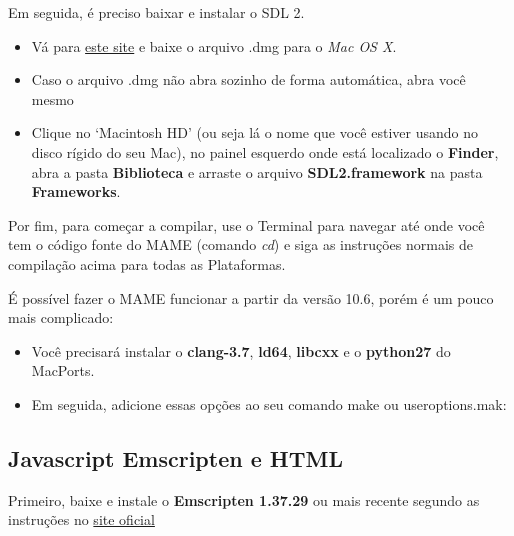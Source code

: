 \documentclass[letterpaper,10pt,brazil]{sphinxmanual}
\begin{document}
Em seguida, é preciso baixar e instalar o SDL 2.
\begin{itemize}
\item {} 
Vá para \href{http://libsdl.org/download-2.0.php}{este site} e baixe o
arquivo .dmg para o \emph{Mac OS X}.

\item {} 
Caso o arquivo .dmg não abra sozinho de forma automática, abra você
mesmo

\item {} 
Clique no `Macintosh HD' (ou seja lá o nome que você estiver usando
no disco rígido do seu Mac), no painel esquerdo onde está localizado
o \textbf{Finder}, abra a pasta \textbf{Biblioteca} e arraste o arquivo
\textbf{SDL2.framework} na pasta \textbf{Frameworks}.

\end{itemize}

Por fim, para começar a compilar, use o Terminal para navegar até onde
você tem o código fonte do MAME (comando \emph{cd}) e siga as instruções
normais de compilação acima para todas as Plataformas.

É possível fazer o MAME funcionar a partir da versão 10.6, porém é um
pouco mais complicado:
\begin{itemize}
\item {} 
Você precisará instalar o \textbf{clang-3.7}, \textbf{ld64}, \textbf{libcxx} e o
\textbf{python27} do MacPorts.

\item {} 
Em seguida, adicione essas opções ao seu comando make ou
useroptions.mak:

\end{itemize}

\begin{DUlineblock}{0em}
\item[] 
\item[] 
\item[] 
\item[] 
\end{DUlineblock}


\subsection{Javascript Emscripten e HTML}
\label{initialsetup/compilingmame:javascript-emscripten-e-html}
Primeiro, baixe e instale o \textbf{Emscripten 1.37.29} ou mais recente
segundo as instruções no \href{https://kripken.github.io/emscripten-site/docs/getting\_started/downloads.html}{site oficial}
\end{document}
